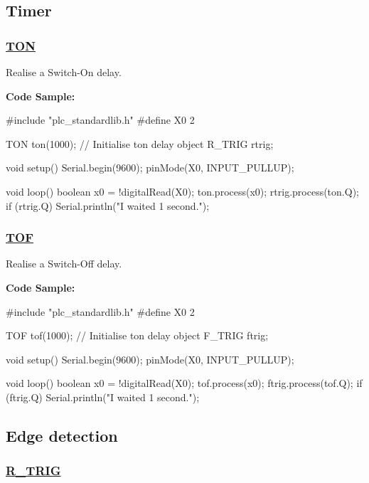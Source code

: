 \subsection*{Timer}

\subsubsection*{\hyperlink{class_t_o_n}{T\+O\+N}}

Realise a Switch-\/\+On delay.

{\bfseries Code Sample\+:} \begin{DoxyVerb}#include "plc_standardlib.h"
#define X0 2

TON ton(1000);  // Initialise ton delay object
R_TRIG rtrig;

void setup() {
    Serial.begin(9600);
    pinMode(X0, INPUT_PULLUP);
}

void loop() {
    boolean x0 = !digitalRead(X0);
    ton.process(x0);
    rtrig.process(ton.Q);
    if (rtrig.Q) {
        Serial.println("I waited 1 second.");
    }
}
\end{DoxyVerb}


\subsubsection*{\hyperlink{class_t_o_f}{T\+O\+F}}

Realise a Switch-\/\+Off delay.

{\bfseries Code Sample\+:} \begin{DoxyVerb}#include "plc_standardlib.h"
#define X0 2

TOF tof(1000);  // Initialise ton delay object
F_TRIG ftrig;

void setup() {
    Serial.begin(9600);
    pinMode(X0, INPUT_PULLUP);
}

void loop() {
    boolean x0 = !digitalRead(X0);
    tof.process(x0);
    ftrig.process(tof.Q);
    if (ftrig.Q) {
        Serial.println("I waited 1 second.");
    }
}
\end{DoxyVerb}


\subsection*{Edge detection}

\subsubsection*{\hyperlink{class_r___t_r_i_g}{R\+\_\+\+T\+R\+I\+G}}

